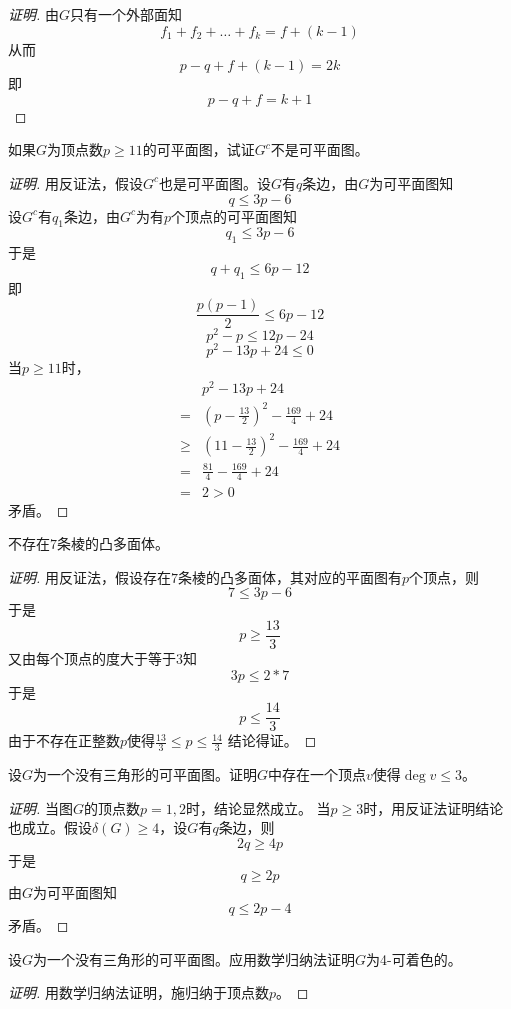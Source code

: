 \documentclass{article}
\begin{document}
\begin{CJK}{UTF8}{gbsn}
\begin{proof}[证明]
  由$G$只有一个外部面知
  \[f_1 + f_2 + \ldots + f_k = f + (k-1)\]
  从而
  \[p-q+f+(k-1)=2k\]
  即
  \[p-q+f = k + 1\]
  \end{proof}  
\begin{Exercise}
    如果$G$为顶点数$p\geq 11$的可平面图，试证$G^c$不是可平面图。
\end{Exercise}
\begin{proof}[证明]
    用反证法，假设$G^c$也是可平面图。设$G$有$q$条边，由$G$为可平面图知
  \[q \leq 3p - 6\]
  设$G^c$有$q_1$条边，由$G^c$为有$p$个顶点的可平面图知
  \[q_1 \leq 3p - 6\]
  于是
  \[q + q _1 \leq 6p-12\]
  即
  \[\frac{p(p-1)}{2} \leq 6p-12\]
  \[p^2-p \leq 12p-24\]
  \[p^2-13p+24 \leq 0\]
  当$p\geq 11$时，
  \begin{equation*}
    \begin{split}
     &p^2-13p+24\\
     =&(p-\frac{13}{2})^2-\frac{169}{4}+24\\
     \geq&(11-\frac{13}{2})^2-\frac{169}{4} + 24\\
     =&\frac{81}{4} - \frac{169}{4} + 24\\
     =&2 > 0
    \end{split}
  \end{equation*}
  矛盾。
\end{proof}
\begin{Exercise}
    不存在$7$条棱的凸多面体。
\end{Exercise}
\begin{proof}[证明]
    用反证法，假设存在$7$条棱的凸多面体，其对应的平面图有$p$个顶点，则
    \[7 \leq 3p - 6\]
    于是
    \[p \geq \frac{13}{3}\]
    又由每个顶点的度大于等于$3$知
    \[3p \leq 2 * 7\]
    于是
    \[p \leq \frac{14}{3}\]
    由于不存在正整数$p$使得$\frac{13}{3} \leq p \leq \frac{14}{3}$
    结论得证。
  \end{proof}
\begin{Exercise}
    设$G$为一个没有三角形的可平面图。证明$G$中存在一个顶点$v$使得$\deg v \leq 3$。
\end{Exercise}
\begin{proof}[证明]
    当图$G$的顶点数$p=1,2$时，结论显然成立。
    当$p \geq 3$时，用反证法证明结论也成立。假设$\delta (G) \geq 4$，设$G$有$q$条边，则
    \[2q \geq 4p\]
    于是\[q \geq 2p\]
    由$G$为可平面图知
    \[q \leq 2p - 4\]
  矛盾。  
  \end{proof}
\begin{Exercise}
    设$G$为一个没有三角形的可平面图。应用数学归纳法证明$G$为4-可着色的。
\end{Exercise}
\begin{proof}[证明]用数学归纳法证明，施归纳于顶点数$p$。


\end{proof}
\end{CJK}
\end{document}
